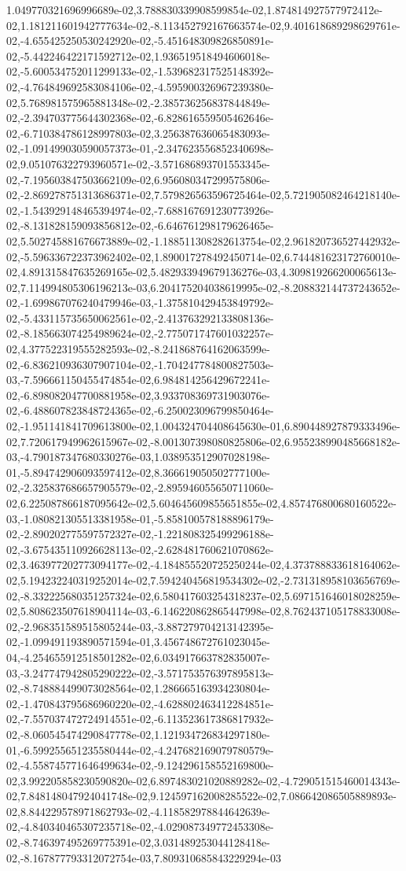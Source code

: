 1.049770321696996689e-02,3.788830339908599854e-02,1.874814927577972412e-02,1.181211601942777634e-02,-8.113452792167663574e-02,9.401618689298629761e-02,-4.655425250530242920e-02,-5.451648309826850891e-02,-5.442246422171592712e-02,1.936519518494606018e-02,-5.600534752011299133e-02,-1.539682317525148392e-02,-4.764849692583084106e-02,-4.595900326967239380e-02,5.768981575965881348e-02,-2.385736256837844849e-02,-2.394703775644302368e-02,-6.828616559505462646e-02,-6.710384786128997803e-02,3.256387636065483093e-02,-1.091499030590057373e-01,-2.347623556852340698e-02,9.051076322793960571e-02,-3.571686893701553345e-02,-7.195603847503662109e-02,6.956080347299575806e-02,-2.869278751313686371e-02,7.579826563596725464e-02,5.721905082464218140e-02,-1.543929148465394974e-02,-7.688167691230773926e-02,-8.131828159093856812e-02,-6.646761298179626465e-02,5.502745881676673889e-02,-1.188511308282613754e-02,2.961820736527442932e-02,-5.596336722373962402e-02,1.890017278492450714e-02,6.744481623172760010e-02,4.891315847635269165e-02,5.482933949679136276e-03,4.309819266200065613e-02,7.114994805306196213e-03,6.204175204038619995e-02,-8.208832144737243652e-02,-1.699867076240479946e-03,-1.375810429453849792e-02,-5.433115735650062561e-02,-2.413763292133808136e-02,-8.185663074254989624e-02,-2.775071747601032257e-02,4.377522319555282593e-02,-8.241868764162063599e-02,-6.836210936307907104e-02,-1.704247784800827503e-03,-7.596661150455474854e-02,6.984814256429672241e-02,-6.898082047700881958e-02,3.933708369731903076e-02,-6.488607823848724365e-02,-6.250023096799850464e-02,-1.951141841709613800e-02,1.004324704408645630e-01,6.890448927879333496e-02,7.720617949962615967e-02,-8.001307398080825806e-02,6.955238990485668182e-03,-4.790187347680330276e-03,1.038953512907028198e-01,-5.894742906093597412e-02,8.366619050502777100e-02,-2.325837686657905579e-02,-2.895946055650711060e-02,6.225087866187095642e-02,5.604645609855651855e-02,4.857476800680160522e-03,-1.080821305513381958e-01,-5.858100578188896179e-02,-2.890202775597572327e-02,-1.221808325499296188e-02,-3.675435110926628113e-02,-2.628481760621070862e-02,3.463977202773094177e-02,-4.184855520725250244e-02,4.373788833618164062e-02,5.194232240319252014e-02,7.594240456819534302e-02,-2.731318958103656769e-02,-8.332225680351257324e-02,6.580417603254318237e-02,5.697151646018028259e-02,5.808623507618904114e-03,-6.146220862865447998e-02,8.762437105178833008e-02,-2.968351589515805244e-03,-3.887279704213142395e-02,-1.099491193890571594e-01,3.456748672761023045e-04,-4.254655912518501282e-02,6.034917663782835007e-03,-3.247747942805290222e-02,-3.571753576397895813e-02,-8.748884499073028564e-02,1.286665163934230804e-02,-1.470843795686960220e-02,-4.628802463412284851e-02,-7.557037472724914551e-02,-6.113523617386817932e-02,-8.060545474290847778e-02,1.121934726834297180e-01,-6.599255651235580444e-02,-4.247682169079780579e-02,-4.558745771646499634e-02,-9.124296158552169800e-02,3.992205858230590820e-02,6.897483021020889282e-02,-4.729051515460014343e-02,7.848148047924041748e-02,9.124597162008285522e-02,7.086642086505889893e-02,8.844229578971862793e-02,-4.118582978844642639e-02,-4.840340465307235718e-02,-4.029087349772453308e-02,-8.746397495269775391e-02,3.031489253044128418e-02,-8.167877793312072754e-03,7.809310685843229294e-03
